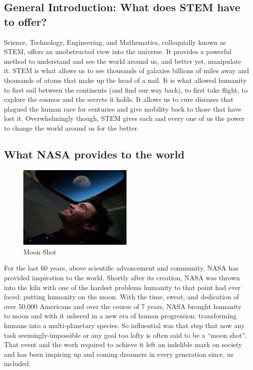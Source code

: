 \documentclass{article}
\let\Oldsubsection\subsection
\renewcommand{\subsection}{\FloatBarrier\Oldsubsection}
\begin{document}
\subsection{General Introduction: What does STEM have to offer?}

Science, Technology, Engineering, and Mathematics, colloquially known as STEM, offers an unobstructed view into the universe. It provides a powerful method to understand and see the world around us, and better yet, manipulate it. STEM is what allows us to see thousands of galaxies billions of miles away and thousands of atoms that make up the head of a nail. It is what allowed humanity to first sail between the continents (and find our way back), to first take flight, to explore the cosmos and the secrets it holds. It allows us to cure diseases that plagued the human race  for centuries and give mobility back to those that have lost it. Overwhelmingly  though, STEM gives each and every one of us the power to change the world around us for the better.

\subsection{What NASA provides to the world}

\begin{figure}[!htb]
  \centering
  \includegraphics[width=0.5\textwidth]{assets/smilingatthemoon.jpg}
  \caption{Moon Shot}
  \label{fig:smilingatthemoon}
\end{figure}

For the last 60 years, above scientific advancement and community, NASA has provided inspiration to the world. Shortly after its creation, NASA was thrown into the kiln with one of the hardest problems humanity to that point had ever faced: putting humanity on the moon. With the time, sweat, and dedication of over 50,000 Americans and over the course of 7 years, NASA brought humanity to moon and with it ushered in a new era of human progression: transforming humans into a multi-planetary species. So influential was that step that now any task seemingly-impossible or any goal too lofty is often said to be a “moon shot”. That event and the work required to achieve it left an indelible mark on society and has been inspiring up and coming dreamers in every generation since, us included. 
\end{document}
